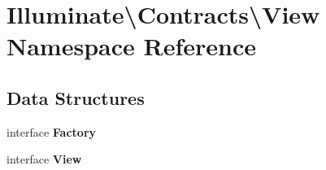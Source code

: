 \section{Illuminate\textbackslash{}Contracts\textbackslash{}View Namespace Reference}
\label{namespace_illuminate_1_1_contracts_1_1_view}
\subsection*{Data Structures}
\begin{DoxyCompactItemize}
\item 
interface {\bf Factory}
\item 
interface {\bf View}
\end{DoxyCompactItemize}
